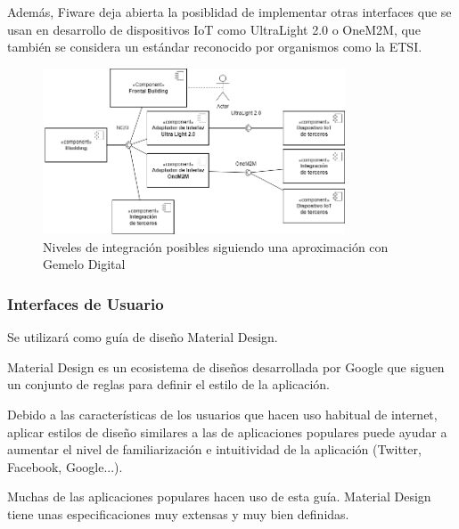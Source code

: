 \documentclass[12pt, a4paper, twoside]{article}
\begin{document}
Además, Fiware deja abierta la posiblidad de implementar otras interfaces que se usan en desarrollo de dispositivos
IoT como UltraLight 2.0 o OneM2M, que también se considera un estándar reconocido por organismos
como la ETSI.

\begin{figure}[h]
  \centering
  \includegraphics[width=0.8\textwidth]{IBuildingGenericComponents.1.1.png}
  \caption{Niveles de integración posibles siguiendo una aproximación con Gemelo Digital}
\end{figure}

\subsubsection{Interfaces de Usuario}
Se utilizará como guía de diseño Material Design.

Material Design es un ecosistema de diseños desarrollada por Google
que siguen un conjunto de reglas para definir el estilo de la aplicación.

Debido a las características de los usuarios que hacen uso habitual de internet,
aplicar estilos de diseño similares a las de aplicaciones populares puede ayudar a aumentar
el nivel de familiarización e intuitividad de la aplicación (Twitter, Facebook, Google...).

Muchas de las aplicaciones populares hacen uso de esta guía.
Material Design tiene unas especificaciones muy extensas y muy bien definidas. 
\end{document}
